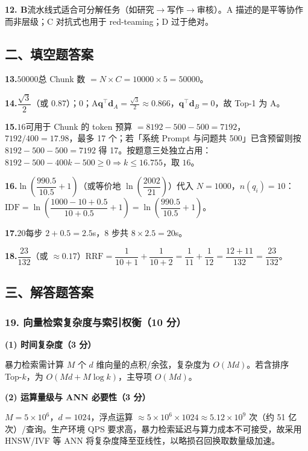\documentclass[11pt,a4paper]{article}
\begin{document}
\noindent\textbf{12. B}\quad 流水线式适合可分解任务（如研究$\to$写作$\to$审核）。A 描述的是平等协作而非层级；C 对抗式也用于 red-teaming；D 过于绝对。

\subsection*{\heiti 二、填空题答案}

\noindent\textbf{13.}\quad $50000$\quad 总 Chunk 数 $=N\times C=10000\times5=50000$。

\noindent\textbf{14.}\quad $\dfrac{\sqrt{3}}{2}$（或 $0.87$）\quad；\quad $0$\quad；\quad A\quad $\mathbf{q}^{\top}\mathbf{d}_A=\tfrac{\sqrt{3}}{2}\approx0.866$，$\mathbf{q}^{\top}\mathbf{d}_B=0$，故 Top-1 为 A。

\noindent\textbf{15.}\quad $16$\quad 可用于 Chunk 的 token 预算 $=8192-500-500=7192$，$7192/400=17.98$，最多 17 个；若「系统 Prompt 与问题共 500」已含预留则按 $8192-500-500=7192$ 得 17。按题意三处独立占用：$8192-500-400k-500\ge0\Rightarrow k\le16.755$，取 $\boxed{16}$。

\noindent\textbf{16.}\quad $\ln\!\left(\dfrac{990.5}{10.5}+1\right)$（或等价地 $\ln\!\left(\dfrac{2002}{21}\right)$）\quad 代入 $N=1000$，$n(q_i)=10$：$\mathrm{IDF}=\ln\!\left(\dfrac{1000-10+0.5}{10+0.5}+1\right)=\ln\!\left(\dfrac{990.5}{10.5}+1\right)$。

\noindent\textbf{17.}\quad $20$\quad 每步 $2+0.5=2.5$s，8 步共 $8\times2.5=20$s。

\noindent\textbf{18.}\quad $\dfrac{23}{132}$（或 $\approx 0.17$）\quad $\mathrm{RRF}=\dfrac{1}{10+1}+\dfrac{1}{10+2}=\dfrac{1}{11}+\dfrac{1}{12}=\dfrac{12+11}{132}=\dfrac{23}{132}$。

\subsection*{\heiti 三、解答题答案}

\subsubsection*{19. 向量检索复杂度与索引权衡（10 分）}

\noindent\textbf{(1) 时间复杂度（3 分）}

暴力检索需计算 $M$ 个 $d$ 维向量的点积/余弦，复杂度为 $O(Md)$。若含排序 Top-$k$，为 $O(Md + M\log k)$，主导项 $O(Md)$。

\noindent\textbf{(2) 运算量级与 ANN 必要性（3 分）}

$M=5\times10^6$，$d=1024$，浮点运算 $\approx5\times10^6\times1024\approx5.12\times10^9$ 次（约 51 亿次）/查询。生产环境 QPS 要求高，暴力检索延迟与算力成本不可接受，故采用 HNSW/IVF 等 ANN 将复杂度降至亚线性，以略损召回换取数量级加速。
\end{document}
